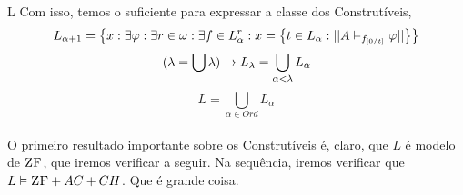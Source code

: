        \begin{definition}{L}
            Com isso, temos o suficiente para expressar a classe dos Construtíveis,
            $$ L_{\alpha+1} = \SET{x : \exists \varphi:\exists r\in\omega:\exists f\in L_\alpha^r: x = \SET{t\in L_\alpha : || A \vDash_{f_{[0\slash t]}} \varphi ||}} $$ 
            $$ (\lambda     = \bigcup\lambda) \rightarrow L_\lambda = \bigcup_{\alpha < \lambda} L_\alpha $$ 
            $$ L = \bigcup_{\alpha\in Ord} L_\alpha $$
        \end{definition}

        \paragraph{}
            O primeiro resultado importante sobre os Construtíveis é, claro, que $L$ é modelo de $\text{\sc ZF}$, que iremos verificar a seguir. Na sequência, iremos verificar 
            que $L \vDash \text{\sc ZF}+AC+CH$. Que é grande coisa.